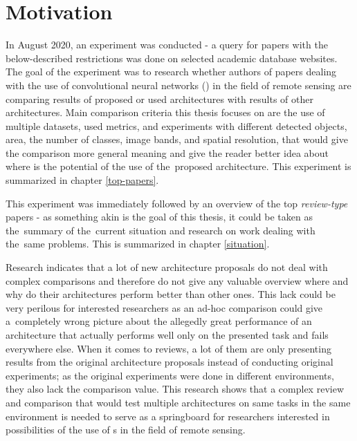 \chapter{Motivation}
\label{motivation}

In August 2020, an experiment was conducted - a query for papers with the below-described restrictions was done on selected academic database websites. The goal of the experiment was to research whether authors of papers dealing with the use of convolutional neural networks () in the field of remote sensing are comparing results of proposed or used architectures with results of other architectures. Main comparison criteria this thesis focuses on are the use of multiple datasets, used metrics, and experiments with different detected objects, area, the number of classes, image bands, and spatial resolution, that would give the comparison more general meaning and give the reader better idea about where is the potential of the use of the~proposed architecture. This experiment is summarized in chapter \ref{top-papers}.

This experiment was immediately followed by an overview of the top \textit{review-type} papers - as something akin is the goal of this thesis, it could be taken as the~summary of the~current situation and research on work dealing with the~same problems. This is summarized in chapter \ref{situation}.

Research indicates that a lot of new  architecture proposals do not deal with complex comparisons and therefore do not give any valuable overview where and why do their architectures perform better than other ones. This lack could be very perilous for interested researchers as an ad-hoc comparison could give a~completely wrong picture about the allegedly great performance of an architecture that actually performs well only on the presented task and fails everywhere else. When it comes to reviews, a lot of them are only presenting results from the original architecture proposals instead of conducting original experiments; as the original experiments were done in different environments, they also lack the comparison value. This research shows that a complex review and comparison that would test multiple architectures on same tasks in the same environment is needed to serve as a springboard for researchers interested in possibilities of the use of s in the field of remote sensing.

